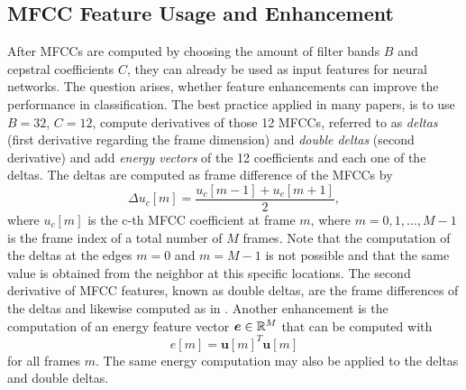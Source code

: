 
\subsection{MFCC Feature Usage and Enhancement}\label{sec:signal_mfcc_enhancement}
After MFCCs are computed by choosing the amount of filter bands $B$ and cepstral coefficients $C$, they can already be used as input features for neural networks.
The question arises, whether feature enhancements can improve the performance in classification.
The best practice applied in many papers, is to use $B=32$, $C=12$, compute derivatives of those 12 MFCCs, referred to as \emph{deltas} (first derivative regarding the frame dimension) and \emph{double deltas} (second derivative) and add \emph{energy vectors} of the 12 coefficients and each one of the deltas.
The deltas are computed as frame difference of the MFCCs by
\begin{equation}\label{eq:signal_mfcc_delta}
  \Delta u_c[m] = \frac{u_c[m - 1] + u_c[m + 1]}{2},
\end{equation}
where $u_c[m]$ is the c-th MFCC coefficient at frame $m$, where $m = 0, 1, \dots, M - 1$ is the frame index of a total number of $M$ frames.
Note that the computation of the deltas at the edges $m=0$ and $m=M - 1$ is not possible and that the same value is obtained from the neighbor at this specific locations.
The second derivative of MFCC features, known as double deltas, are the frame differences of the deltas and likewise computed as in .
Another enhancement is the computation of an energy feature vector $\bm{e} \in \mathbb{R}^M$ that can be computed with
\begin{equation}
  e[m] = \bm{u}[m]^T \bm{u}[m]
\end{equation}
for all frames $m$.
The same energy computation may also be applied to the deltas and double deltas.


